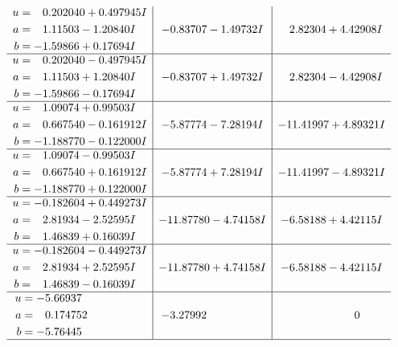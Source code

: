 \documentclass[1p]{elsarticle_modified}
\theoremstyle{definition}
\begin{document}
$$\begin{array}{c|c|c}
\begin{aligned}
u &= \phantom{-}0.202040 + 0.497945 I \\
a &= \phantom{-}1.11503 - 1.20840 I \\
b &= -1.59866 + 0.17694 I\end{aligned}
 & -0.83707 - 1.49732 I & \phantom{-}2.82304 + 4.42908 I \\ \hline\begin{aligned}
u &= \phantom{-}0.202040 - 0.497945 I \\
a &= \phantom{-}1.11503 + 1.20840 I \\
b &= -1.59866 - 0.17694 I\end{aligned}
 & -0.83707 + 1.49732 I & \phantom{-}2.82304 - 4.42908 I \\ \hline\begin{aligned}
u &= \phantom{-}1.09074 + 0.99503 I \\
a &= \phantom{-}0.667540 - 0.161912 I \\
b &= -1.188770 - 0.122000 I\end{aligned}
 & -5.87774 - 7.28194 I & -11.41997 + 4.89321 I \\ \hline\begin{aligned}
u &= \phantom{-}1.09074 - 0.99503 I \\
a &= \phantom{-}0.667540 + 0.161912 I \\
b &= -1.188770 + 0.122000 I\end{aligned}
 & -5.87774 + 7.28194 I & -11.41997 - 4.89321 I \\ \hline\begin{aligned}
u &= -0.182604 + 0.449273 I \\
a &= \phantom{-}2.81934 - 2.52595 I \\
b &= \phantom{-}1.46839 + 0.16039 I\end{aligned}
 & -11.87780 - 4.74158 I & -6.58188 + 4.42115 I \\ \hline\begin{aligned}
u &= -0.182604 - 0.449273 I \\
a &= \phantom{-}2.81934 + 2.52595 I \\
b &= \phantom{-}1.46839 - 0.16039 I\end{aligned}
 & -11.87780 + 4.74158 I & -6.58188 - 4.42115 I \\ \hline\begin{aligned}
u &= -5.66937\phantom{ +0.000000I} \\
a &= \phantom{-}0.174752\phantom{ +0.000000I} \\
b &= -5.76445\phantom{ +0.000000I}\end{aligned}
 & -3.27992\phantom{ +0.000000I} & \phantom{-0.000000 } 0\\
 \hline 
 \end{array}$$\newpage
\end{document}
